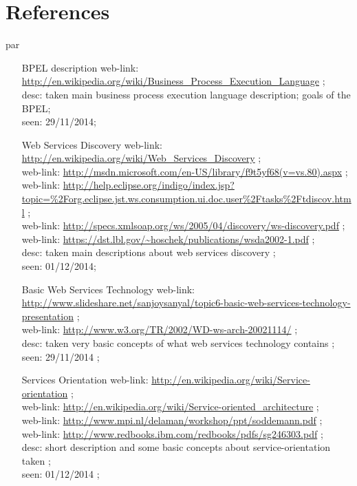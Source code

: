 \section{References}
par{
\begin{enumerate}
\item [BPEL description] web-link: \url{http://en.wikipedia.org/wiki/Business_Process_Execution_Language} ; \\ desc: taken main business process execution language description; goals of the BPEL; \\ seen: 29/11/2014; \\
\item [Web Services Discovery] web-link: \url{http://en.wikipedia.org/wiki/Web_Services_Discovery} ; \\ 
web-link: \url{http://msdn.microsoft.com/en-US/library/f9t5yf68(v=vs.80).aspx} ; \\
web-link: \url{http://help.eclipse.org/indigo/index.jsp?topic=%2Forg.eclipse.jst.ws.consumption.ui.doc.user%2Ftasks%2Ftdiscov.html} ; \\ 
web-link: \url{http://specs.xmlsoap.org/ws/2005/04/discovery/ws-discovery.pdf} ; \\
web-link: \url{https://dst.lbl.gov/~hoschek/publications/wsda2002-1.pdf} ; \\
desc: taken main descriptions about web services discovery ; \\ seen: 01/12/2014; \\
\item [Basic Web Services Technology] web-link: \url{http://www.slideshare.net/sanjoysanyal/topic6-basic-web-services-technology-presentation} ; \\ 
web-link: \url{http://www.w3.org/TR/2002/WD-ws-arch-20021114/} ; \\ desc: taken very basic concepts of what web services technology contains ; \\ seen: 29/11/2014 ; \\
\item [Services Orientation] web-link: \url{http://en.wikipedia.org/wiki/Service-orientation} ; \\ 
web-link: \url{http://en.wikipedia.org/wiki/Service-oriented_architecture} ; \\ 
web-link: \url{http://www.mpi.nl/delaman/workshop/ppt/soddemann.pdf} ; \\ 
web-link: \url{http://www.redbooks.ibm.com/redbooks/pdfs/sg246303.pdf} ; \\ desc: short description and some basic concepts about service-orientation taken ; \\ seen: 01/12/2014 ; \\

\end{enumerate}}

